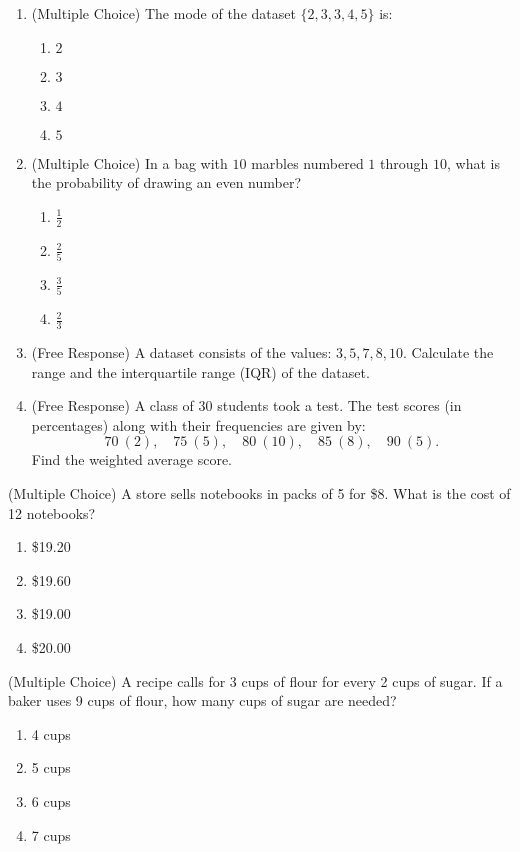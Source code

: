 \documentclass[12pt]{article}
\begin{document}
\begin{enumerate}[label=\textbf{Question \arabic*:}]
  \item (Multiple Choice) The mode of the dataset \(\{2, 3, 3, 4, 5\}\) is:
    \begin{enumerate}[label=(\Alph*)]
      \item \(2\)
      \item \(3\)
      \item \(4\)
      \item \(5\)
    \end{enumerate}
    
  \item (Multiple Choice) In a bag with \(10\) marbles numbered \(1\) through \(10\), what is the probability of drawing an even number?
    \begin{enumerate}[label=(\Alph*)]
      \item \(\frac{1}{2}\)
      \item \(\frac{2}{5}\)
      \item \(\frac{3}{5}\)
      \item \(\frac{2}{3}\)
    \end{enumerate}
    
  \item (Free Response) A dataset consists of the values: \(3, 5, 7, 8, 10\). Calculate the range and the interquartile range (IQR) of the dataset.
    
  \item (Free Response) A class of \(30\) students took a test. The test scores (in percentages) along with their frequencies are given by:
    \[
    70 \ (2),\quad 75 \ (5),\quad 80 \ (10),\quad 85 \ (8),\quad 90 \ (5).
    \]
    Find the weighted average score.
\end{enumerate}

\item (Multiple Choice) A store sells notebooks in packs of 5 for \$8. What is the cost of 12 notebooks?
    \begin{enumerate}[label=(\Alph*)]
      \item \$19.20
      \item \$19.60
      \item \$19.00
      \item \$20.00
    \end{enumerate}
    
  \item (Multiple Choice) A recipe calls for 3 cups of flour for every 2 cups of sugar. If a baker uses 9 cups of flour, how many cups of sugar are needed?
    \begin{enumerate}[label=(\Alph*)]
      \item 4 cups
      \item 5 cups
      \item 6 cups
      \item 7 cups
    \end{enumerate}
    
\end{document}
